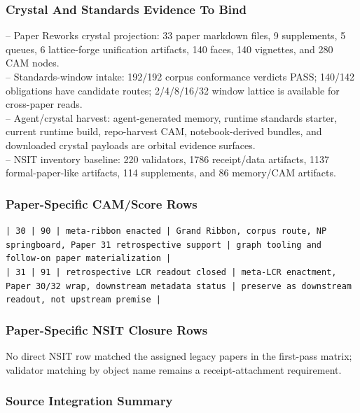 \documentclass[11pt]{article}
\begin{document}
\subsubsection*{Crystal And Standards Evidence To Bind}

\noindent{}-- Paper Reworks crystal projection: 33 paper markdown files, 9 supplements, 5 queues, 6 lattice-forge unification artifacts, 140 faces, 140 vignettes, and 280 CAM nodes.\\
\noindent{}-- Standards-window intake: 192/192 corpus conformance verdicts PASS; 140/142 obligations have candidate routes; 2/4/8/16/32 window lattice is available for cross-paper reads.\\
\noindent{}-- Agent/crystal harvest: agent-generated memory, runtime standards starter, current runtime build, repo-harvest CAM, notebook-derived bundles, and downloaded crystal payloads are orbital evidence surfaces.\\
\noindent{}-- NSIT inventory baseline: 220 validators, 1786 receipt/data artifacts, 1137 formal-paper-like artifacts, 114 supplements, and 86 memory/CAM artifacts.\\

\subsubsection*{Paper-Specific CAM/Score Rows}

\noindent\texttt{| 30 | 90 | meta-ribbon enacted | Grand Ribbon, corpus route, NP springboard, Paper 31 retrospective support | graph tooling and follow-on paper materialization |}\\
\noindent\texttt{| 31 | 91 | retrospective LCR readout closed | meta-LCR enactment, Paper 30/32 wrap, downstream metadata status | preserve as downstream readout, not upstream premise |}\\

\subsubsection*{Paper-Specific NSIT Closure Rows}

No direct NSIT row matched the assigned legacy papers in the first-pass matrix; validator matching by object name remains a receipt-attachment requirement.

\subsubsection*{Source Integration Summary}
\end{document}
